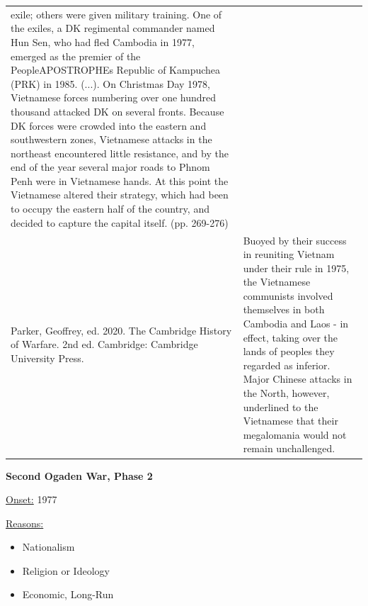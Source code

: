 {\begin{longtable}{p{}p{}}
exile; others were given military training. One of the exiles, a DK regimental commander named Hun Sen, who had fled Cambodia in 1977, emerged as the premier of the PeopleAPOSTROPHEs Republic of Kampuchea (PRK) in 1985. (...). On Christmas Day 1978, Vietnamese forces numbering over one hundred thousand attacked DK on several fronts. Because DK forces were crowded into the eastern and southwestern zones, Vietnamese attacks in the northeast encountered little resistance, and by the end of the year several major roads to Phnom Penh were in Vietnamese hands. At this point the Vietnamese altered their strategy, which had been to occupy the eastern half of the country, and decided to capture the capital itself. (pp. 269-276)
\\
Parker, Geoffrey, ed. 2020. The Cambridge History of Warfare. 2nd ed. Cambridge: Cambridge University Press. & Buoyed by their success in reuniting Vietnam under their rule in 1975, the Vietnamese communists involved themselves in both Cambodia and Laos - in effect, taking over the lands of peoples they regarded as inferior. Major Chinese attacks in the North, however, underlined to the Vietnamese that their megalomania would not remain unchallenged.
\\
\end{longtable}}
\clearpage
         \textbf{Second Ogaden War, Phase 2} 

          \underline{Onset:} 1977         

\underline{Reasons:}
\begin{itemize}
\item Nationalism
\item Religion or Ideology
\item Economic, Long-Run
\end{itemize}

